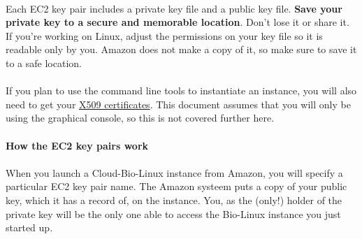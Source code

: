 \paragraph{}Each EC2 key pair includes a private key file and a public key file. \textbf{Save your private key to a secure and memorable location}. Don't lose it or share it. If you're working on Linux, adjust the permissions on your key file so it is readable only by you. Amazon does not make a copy of it, so make sure to save it to a safe location. 

\paragraph{}If you plan to use the command line tools to instantiate an instance, you will also need to get your \href{http://docs.amazonwebservices.com/AWSSecurityCredentials/1.0/AboutAWSCredentials.html#X509Credentials}{X509 certificates}. This document assumes that you will only be using the graphical console, so this is not covered further here. 

\paragraph{How the EC2 key pairs work}

\paragraph{}When you launch a Cloud-Bio-Linux instance from  Amazon, you will specify a particular EC2 key pair name. The Amazon systeem puts a copy of your public key, which it has a record of, on the instance. You, as the (only!) holder of the private key will be the only one able to access the Bio-Linux instance you just started up. 



